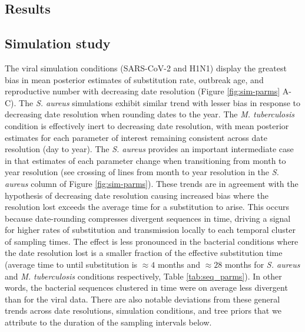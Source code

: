 \documentclass[12pt]{article}
\begin{document}
\begin{spacing}{2}
\section*{Results}
\subsection*{Simulation study}
The viral simulation conditions (SARS-CoV-2 and H1N1) display the greatest bias in mean posterior estimates of substitution rate, outbreak age, and reproductive number with decreasing date resolution (Figure \ref{fig:sim-parms} A-C). The \textit{S. aureus} simulations exhibit  similar trend with lesser bias in response to decreasing date resolution when rounding dates to the year. The \textit{M. tuberculosis} condition is effectively inert to decreasing date resolution, with mean posterior estimates for each parameter of interest remaining consistent across date resolution (day to year). The \textit{S. aureus} provides an important intermediate case in that estimates of each parameter change when transitioning from month to year resolution (see crossing of lines from month to year resolution in the \textit{S. aureus} column of Figure \ref{fig:sim-parms}). These trends are in agreement with the hypothesis of decreasing date resolution causing increased bias where the resolution lost exceeds the average time for a substitution to arise. This occurs because date-rounding compresses divergent sequences in time, driving a signal for higher rates of substitution and transmission locally to each temporal cluster of sampling times.  The effect is less pronounced in the bacterial conditions where the date resolution lost is a smaller fraction of the effective substitution time (average time to until substitution is $\approx4$ months and $\approx28$ months for \textit{S. aureus} and \textit{M. tuberculosis} conditions respectively, Table \ref{tab:seq_parms}). In other words, the bacterial sequences clustered in time were on average less divergent than for the viral data. There are also notable deviations from these general trends across date resolutions, simulation conditions, and tree priors that we attribute to the duration of the sampling intervals below.


\end{spacing}
\end{document}
